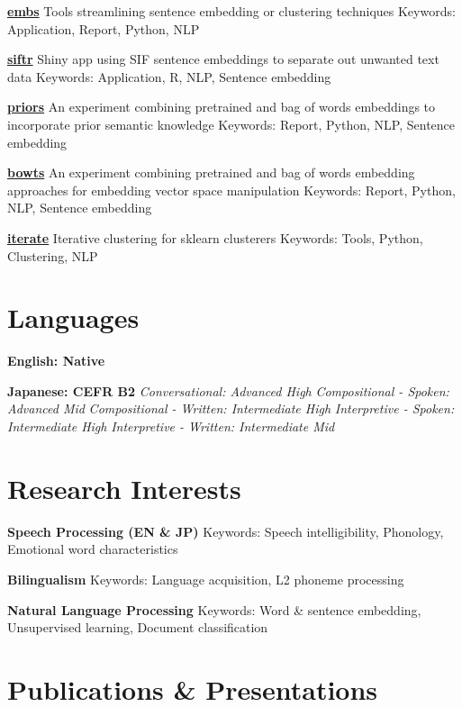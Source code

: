 \documentclass[a4paper,9pt]{extarticle}
\begin{document}
\noindent
\textbf{\href{https://github.com/ryancahildebrandt/embs}{embs}}
Tools streamlining sentence embedding or clustering techniques
Keywords: Application, Report, Python, NLP

\noindent
\textbf{\href{https://github.com/ryancahildebrandt/siftr}{siftr}}
Shiny app using SIF sentence embeddings to separate out unwanted text data
Keywords: Application, R, NLP, Sentence embedding

\noindent
\textbf{\href{https://github.com/ryancahildebrandt/priors}{priors}}
An experiment combining pretrained and bag of words embeddings to incorporate prior semantic knowledge
Keywords: Report, Python, NLP, Sentence embedding

\noindent
\textbf{\href{https://github.com/ryancahildebrandt/bowts}{bowts}}
An experiment combining pretrained and bag of words embedding approaches for embedding vector space manipulation
Keywords: Report, Python, NLP, Sentence embedding

\noindent
\textbf{\href{https://github.com/ryancahildebrandt/iterate}{iterate}}
Iterative clustering for sklearn clusterers
Keywords: Tools, Python, Clustering, NLP

\section*{Languages}

\noindent
\textbf{English: Native}

\noindent
\textbf{Japanese: CEFR B2}
\textit{Conversational: Advanced High}
\textit{Compositional - Spoken: Advanced Mid}
\textit{Compositional - Written: Intermediate High}
\textit{Interpretive - Spoken: Intermediate High}
\textit{Interpretive - Written: Intermediate Mid}

\section*{Research Interests}

\noindent
\textbf{Speech Processing (EN \& JP)}
Keywords: Speech intelligibility, Phonology, Emotional word characteristics

\noindent
\textbf{Bilingualism}
Keywords: Language acquisition, L2 phoneme processing

\noindent
\textbf{Natural Language Processing}
Keywords: Word \& sentence embedding, Unsupervised learning, Document classification

\section*{Publications \& Presentations}
\end{document}
